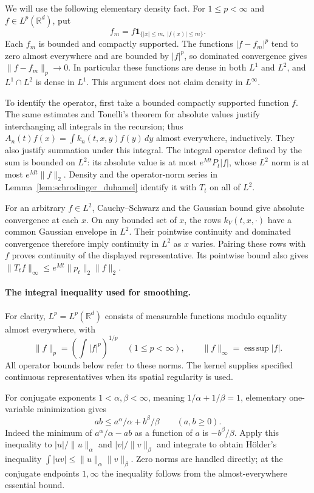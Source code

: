 We will use the following elementary density fact. For $1\leq p<\infty$
and $f\in L^p(\mathbb R^d)$, put
\[
f_m=f\mathbf1_{\{|x|\leq m,\ |f(x)|\leq m\}}.
\]
Each $f_m$ is bounded and compactly supported. The functions
$|f-f_m|^p$ tend to zero almost everywhere and are bounded by $|f|^p$,
so dominated convergence gives $\|f-f_m\|_p\to0$.
In particular these functions are dense in both $L^1$ and $L^2$,
and $L^1\cap L^2$ is dense in $L^1$. This argument does not claim
density in $L^\infty$.

To identify the operator, first take a bounded compactly supported
function $f$. The same estimates and Tonelli's theorem for absolute
values justify interchanging all integrals in the recursion; thus
$A_n(t)f(x)=\int k_n(t,x,y)f(y)\,dy$ almost everywhere, inductively.
They also justify summation under this integral. The integral operator
defined by the sum is bounded on $L^2$: its absolute value is at most
$e^{Mt}P_t|f|$, whose $L^2$ norm is at most $e^{Mt}\|f\|_2$.
Density and the operator-norm series in Lemma~\ref{lem:schrodinger_duhamel}
identify it with $T_t$ on all of $L^2$.

For an arbitrary $f\in L^2$, Cauchy--Schwarz and the Gaussian bound
give absolute convergence at each $x$. On any bounded set of $x$,
the rows $k_V(t,x,\cdot)$ have a common Gaussian envelope in $L^2$.
Their pointwise continuity and dominated convergence therefore imply
continuity in $L^2$ as $x$ varies. Pairing these rows with $f$ proves
continuity of the displayed representative. Its pointwise bound also
gives $\|T_tf\|_\infty\leq e^{Mt}\|p_t\|_2\|f\|_2$.
\Done

\paragraph{The integral inequality used for smoothing.}
For clarity, $L^p=L^p(\mathbb R^d)$ consists of measurable functions
modulo equality almost everywhere, with
\[
\|f\|_p=\left(\int|f|^p\right)^{1/p}\quad(1\leq p<\infty),
\qquad \|f\|_\infty=\operatorname*{ess\,sup}|f|.
\]
All operator bounds below refer to these norms. The kernel supplies
specified continuous representatives when its spatial regularity is used.

For conjugate exponents $1<\alpha,\beta<\infty$, meaning
$1/\alpha+1/\beta=1$, elementary
one-variable minimization gives
\[
ab\leq a^\alpha/\alpha+b^\beta/\beta\qquad(a,b\geq0).
\]
Indeed the minimum of $a^\alpha/\alpha-ab$ as a function of $a$
is $-b^\beta/\beta$. Apply this inequality to
$|u|/\|u\|_\alpha$ and $|v|/\|v\|_\beta$ and integrate to obtain
H\"older's inequality
$\int|uv|\leq\|u\|_\alpha\|v\|_\beta$.
Zero norms are handled directly; at the conjugate endpoints $1,\infty$
the inequality follows from the almost-everywhere essential bound.


